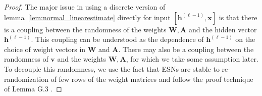 \begin{proof}
	The major issue in using a discrete version of lemma~\ref{lem:normal_linearestimate} directly for input $[\mathbf{h}^{(\ell-1)}, \mathbf{x}]$ is that there is a coupling between the randomness of the weights $\mathbf{W}, \mathbf{A}$ and the hidden vector $\mathbf{h}^{(\ell-1)}$. This coupling can be understood as the dependence of $\mathbf{h}^{(\ell-1)}$ on the choice of weight vectors in $\mathbf{W}$ and $\mathbf{A}$. There may also be a coupling between  the randomness of $\mathbf{v}$ and  the weights $\mathbf{W}, \mathbf{A}$, for which we take some assumption later. To decouple this randomness, we use the fact that ESNs are stable to re-randomization of few rows of the weight matrices and follow the proof technique of Lemma G.3 \cite{allen2019can}. 
	
	
	

\end{proof}
